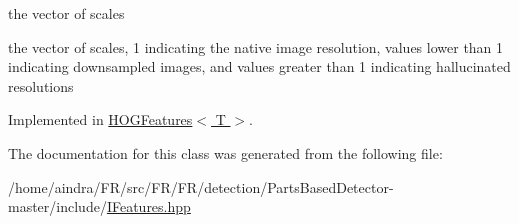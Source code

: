the vector of scales 

the vector of scales, 1 indicating the native image resolution, values lower than 1 indicating downsampled images, and values greater than 1 indicating hallucinated resolutions 

\-Implemented in \hyperlink{classHOGFeatures_ad9668fda860881c676e1d1bd70adc18c}{\-H\-O\-G\-Features$<$ T $>$}.



\-The documentation for this class was generated from the following file\-:\begin{DoxyCompactItemize}
\item 
/home/aindra/\-F\-R/src/\-F\-R/\-F\-R/detection/\-Parts\-Based\-Detector-\/master/include/\hyperlink{IFeatures_8hpp}{\-I\-Features.\-hpp}\end{DoxyCompactItemize}
